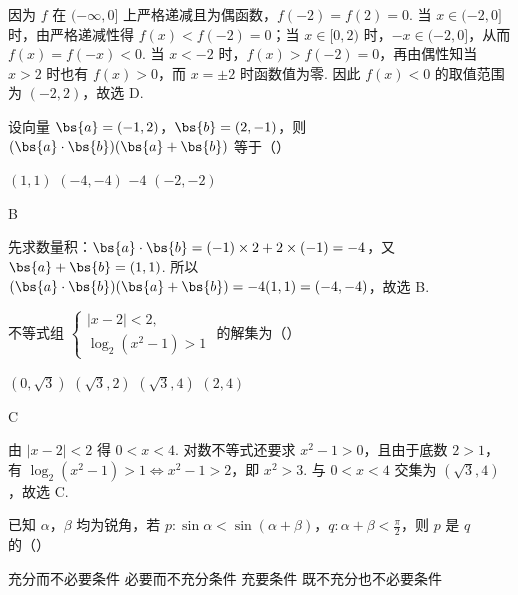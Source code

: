 \begin{solution}
因为 \(f\) 在 \((-\infty,0]\) 上严格递减且为偶函数，\(f(-2)=f(2)=0\). 当 \(x\in(-2,0]\) 时，由严格递减性得 \(f(x)<f(-2)=0\)；当 \(x\in[0,2)\) 时，\(-x\in(-2,0]\)，从而 \(f(x)=f(-x)<0\). 当 \(x<-2\) 时，\(f(x)>f(-2)=0\)，再由偶性知当 \(x>2\) 时也有 \(f(x)>0\)，而 \(x=\pm2\) 时函数值为零. 因此 \(f(x)<0\) 的取值范围为 \((-2,2)\)，故选 D.
\end{solution}

\begin{problem}
设向量 \(\bs{a} = (-1, 2)\)，\(\bs{b} = (2, -1)\)，则 \((\bs{a} \cdot \bs{b})(\bs{a} + \bs{b})\) 等于（\quad）

\choices
    {\((1, 1)\)}
    {\((-4, -4)\)}
    {\(-4\)}
    {\((-2, -2)\)}
\end{problem}

\begin{answer}
B
\end{answer}

\begin{solution}
先求数量积：\(\bs{a}\cdot\bs{b}=(-1)\times2+2\times(-1)=-4\)，又 \(\bs{a}+\bs{b}=(1,1)\). 所以 \((\bs{a}\cdot\bs{b})(\bs{a}+\bs{b})=-4(1,1)=(-4,-4)\)，故选 B.
\end{solution}

\begin{problem}
不等式组 \( \begin{cases}
|x-2|<2,\\
\log_{2}(x^{2}-1)>1
\end{cases} \) 的解集为（\quad）

\choices
    {\((0, \sqrt{3})\)}
    {\((\sqrt{3}, 2)\)}
    {\((\sqrt{3}, 4)\)}
    {\((2,4)\)}
\end{problem}

\begin{answer}
C
\end{answer}

\begin{solution}
由 \(|x-2|<2\) 得 \(0<x<4\). 对数不等式还要求 \(x^2-1>0\)，且由于底数 \(2>1\)，有 \(\log_2(x^2-1)>1\Longleftrightarrow x^2-1>2\)，即 \(x^2>3\). 与 \(0<x<4\) 交集为 \((\sqrt{3},4)\)，故选 C.
\end{solution}

\begin{problem}
已知 \(\alpha\)，\(\beta\) 均为锐角，若 \(p: \sin \alpha < \sin (\alpha + \beta)\)，\(q: \alpha + \beta < \frac{\pi}{2}\)，则 \(p\) 是 \(q\) 的（\quad）

\choices
    {充分而不必要条件}
    {必要而不充分条件}
    {充要条件}
    {既不充分也不必要条件}
\end{problem}

